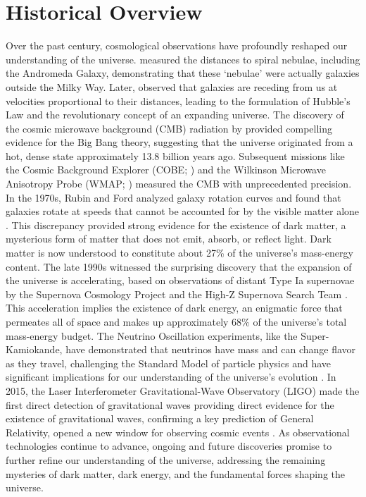 \section{Historical Overview}
Over the past century, cosmological observations have profoundly reshaped our understanding of the universe. \citet{1925Obs....48..139H} measured the distances to spiral nebulae, including the Andromeda Galaxy, demonstrating that these `nebulae' were actually galaxies outside the Milky Way. Later, \citet{1929ApJ....69..103H} observed that galaxies are receding from us at velocities proportional to their distances, leading to the formulation of Hubble's Law and the revolutionary concept of an expanding universe. The discovery of the cosmic microwave background (CMB) radiation by \citet{1965ApJ...142..419P} provided compelling evidence for the Big Bang theory, suggesting that the universe originated from a hot, dense state approximately 13.8 billion years ago. Subsequent missions like the Cosmic Background Explorer (COBE; \citealt{1992ApJ...396L...1S}) and the Wilkinson Microwave Anisotropy Probe (WMAP; \citealt{2003ApJS..148...97B}) measured the CMB with unprecedented precision. In the 1970s, Rubin and Ford analyzed galaxy rotation curves and found that galaxies rotate at speeds that cannot be accounted for by the visible matter alone \citep{1970ApJ...159..379R, 1980ApJ...238..471R}. This discrepancy provided strong evidence for the existence of dark matter, a mysterious form of matter that does not emit, absorb, or reflect light. Dark matter is now understood to constitute about 27\% of the universe's mass-energy content. The late 1990s witnessed the surprising discovery that the expansion of the universe is accelerating, based on observations of distant Type Ia supernovae by the Supernova Cosmology Project and the High-Z Supernova Search Team \citep{1998AJ....116.1009R, 1999ApJ...517..565P}. This acceleration implies the existence of dark energy, an enigmatic force that permeates all of space and makes up approximately 68\% of the universe's total mass-energy budget. The Neutrino Oscillation experiments, like the Super-Kamiokande, have demonstrated that neutrinos have mass and can change flavor as they travel, challenging the Standard Model of particle physics and have significant implications for our understanding of the universe's evolution \citep{1998PhRvL..81.1562F, 2001PhRvL..87g1301A}. In 2015, the Laser Interferometer Gravitational-Wave Observatory (LIGO) made the first direct detection of gravitational waves providing direct evidence for the existence of gravitational waves, confirming a key prediction of General Relativity, opened a new window for observing cosmic events \citep{2016PhRvL.116f1102A}. As observational technologies continue to advance, ongoing and future discoveries promise to further refine our understanding of the universe, addressing the remaining mysteries of dark matter, dark energy, and the fundamental forces shaping the universe.

